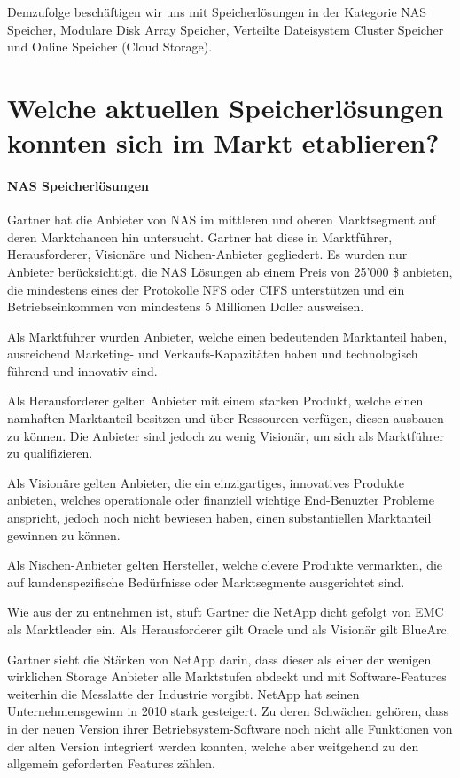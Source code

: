 Demzufolge beschäftigen wir uns mit Speicherlösungen in der Kategorie NAS Speicher, Modulare Disk Array Speicher, Verteilte Dateisystem Cluster Speicher und Online Speicher (Cloud Storage).

\section{Welche aktuellen Speicherlösungen konnten sich im Markt etablieren?}
\label{sec:MarktEtabliert}

\paragraph*{NAS Speicherlösungen}
Gartner hat die Anbieter von NAS im mittleren und oberen Marktsegment auf deren Marktchancen hin untersucht. Gartner hat diese in Marktführer, Herausforderer, Visionäre und Nichen-Anbieter gegliedert. Es wurden nur Anbieter berücksichtigt, die NAS Lösungen ab einem Preis von 25'000 \$ anbieten, die mindestens eines der Protokolle NFS oder CIFS unterstützen und ein Betriebseinkommen von mindestens 5 Millionen Doller ausweisen. 

Als Marktführer wurden Anbieter, welche einen bedeutenden Marktanteil haben, ausreichend Marketing- und Verkaufs-Kapazitäten haben und technologisch führend und innovativ sind.

Als Herausforderer gelten Anbieter mit einem starken Produkt, welche einen namhaften Marktanteil besitzen und über Ressourcen verfügen, diesen ausbauen zu können. Die Anbieter sind jedoch zu wenig Visionär, um sich als Marktführer zu qualifizieren.

Als Visionäre gelten Anbieter, die ein einzigartiges, innovatives Produkte anbieten, welches operationale oder finanziell wichtige End-Benuzter Probleme anspricht, jedoch noch nicht bewiesen haben, einen substantiellen Marktanteil gewinnen zu können.

Als Nischen-Anbieter gelten Hersteller, welche clevere Produkte vermarkten, die auf kundenspezifische Bedürfnisse oder Marktsegmente ausgerichtet sind.

Wie aus der  zu entnehmen ist, stuft Gartner die NetApp dicht gefolgt von EMC als Marktleader ein. Als Herausforderer gilt Oracle und als Visionär gilt BlueArc.

Gartner sieht die Stärken von NetApp darin, dass dieser als einer der wenigen wirklichen Storage Anbieter alle Marktstufen abdeckt und mit Software-Features weiterhin die Messlatte der Industrie vorgibt. NetApp hat seinen Unternehmensgewinn in 2010 stark gesteigert. Zu deren Schwächen gehören, dass in der neuen Version ihrer Betriebsystem-Software noch nicht alle Funktionen von der alten Version integriert werden konnten, welche aber weitgehend zu den allgemein geforderten Features zählen.

